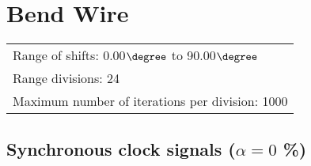 \section{Bend Wire}
\flushleft
\begin{tabular}[l]{l}

  Range of shifts: 0.00$\degree$ to 90.00$\degree$ \\
  Range divisions: 24\\
  Maximum number of iterations per division: 1000\\

\end{tabular}

\subsection{Synchronous clock signals ($\alpha=0$ \%)}

